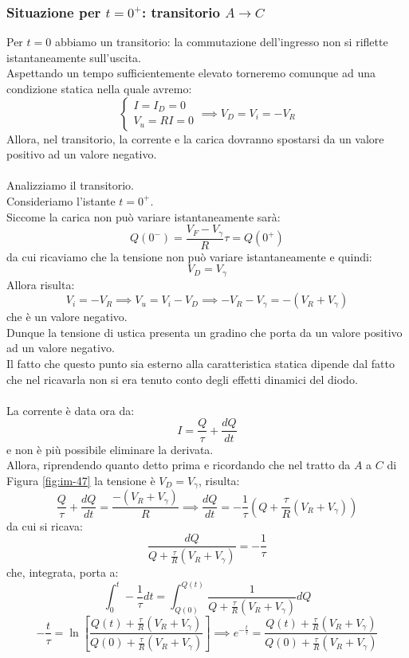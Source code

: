 \documentclass[../main.tex]{subfiles}
\begin{document}
	\subsubsection{Situazione per $t = 0^+$: transitorio $A \rightarrow C$}
	Per $t = 0$ abbiamo un transitorio: la commutazione dell’ingresso non si riflette istantaneamente sull’uscita. \\
	Aspettando un tempo sufficientemente elevato torneremo comunque ad una condizione statica nella quale avremo:
	$$\begin{cases} I = I_D = 0 \\ V_u = RI = 0 \end{cases} \implies V_D = V_i = -V_R$$
	Allora, nel transitorio, la corrente e la carica dovranno spostarsi da un valore positivo ad un valore negativo.\\\\
	Analizziamo il transitorio. \\
	Consideriamo l’istante $t = 0^+$. \\
	Siccome la carica non può variare istantaneamente sarà:
	$$Q(0^-) = \frac{V_F - V_\gamma}{R} \tau = Q(0^+)$$
	da cui ricaviamo che la tensione non può variare istantaneamente e quindi:
	$$V_D = V_\gamma$$
	Allora risulta:
	$$V_i = -V_R \implies V_u = V_i - V_D \implies -V_R - V_\gamma = -(V_R + V_\gamma)$$
	che è un valore negativo. \\
	Dunque la tensione di ustica presenta un gradino che porta da un valore positivo ad un valore negativo. \\
	Il fatto che questo punto sia esterno alla caratteristica statica dipende dal fatto che nel ricavarla non si era tenuto conto degli effetti dinamici del diodo.\\\\
	La corrente è data ora da:
	$$I = \frac{Q}{\tau} + \frac{dQ}{dt}$$
	e non è più possibile eliminare la derivata. \\
	Allora, riprendendo quanto detto prima e ricordando che nel tratto da $A$ a $C$ di Figura \ref{fig:im-47} la tensione è $V_D = V_\gamma$, risulta:
	$$\frac{Q}{\tau} + \frac{dQ}{dt} = \frac{-(V_R + V_\gamma)}{R} \implies \frac{dQ}{dt} = -\frac{1}{\tau} \left( Q + \frac{\tau}{R} (V_R + V_\gamma) \right)$$
	da cui si ricava:
	$$\frac{dQ}{Q + \frac{\tau}{R} (V_R + V_\gamma)} = -\frac{1}{\tau}$$
	che, integrata, porta a:
	$$\int_0^t -\frac{1}{\tau} dt = \int_{Q(0)}^{Q(t)} \frac{1}{Q + \frac{\tau}{R} (V_R + V_\gamma)} dQ$$ $$-\frac{t}{\tau} = \ln \left[ \frac{Q(t) + \frac{\tau}{R} (V_R + V_\gamma)}{Q(0) + \frac{\tau}{R} (V_R + V_\gamma)} \right] \implies e^{-\frac{t}{\tau}} = \frac{Q(t) + \frac{\tau}{R} (V_R + V_\gamma)}{Q(0) + \frac{\tau}{R} (V_R + V_\gamma)}$$
\end{document}
